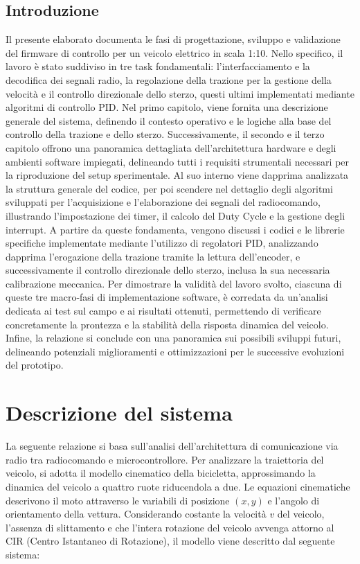 \documentclass[11pt]{report}
\begin{document}
\pagestyle{plain}

\section*{Introduzione}
Il presente elaborato documenta le fasi di progettazione, sviluppo e validazione del firmware di controllo per un veicolo elettrico in scala 1:10. Nello specifico, il lavoro è stato suddiviso in tre task fondamentali: l'interfacciamento e la decodifica dei segnali radio, la regolazione della trazione per la gestione della velocità e il controllo direzionale dello sterzo, questi ultimi implementati mediante algoritmi di controllo PID.
Nel primo capitolo, viene fornita una descrizione generale del sistema, definendo il contesto operativo e le logiche alla base del controllo della trazione e dello sterzo. Successivamente, il secondo e il terzo capitolo offrono una panoramica dettagliata dell'architettura hardware e degli ambienti software impiegati, delineando tutti i requisiti strumentali necessari per la riproduzione del setup sperimentale. 
Al suo interno viene dapprima analizzata la struttura generale del codice, per poi scendere nel dettaglio degli algoritmi sviluppati per l'acquisizione e l'elaborazione dei segnali del radiocomando, 
illustrando l'impostazione dei timer, il calcolo del Duty Cycle e la gestione degli interrupt. A partire da queste fondamenta, vengono discussi i codici e le librerie specifiche implementate mediante l'utilizzo di regolatori PID, analizzando dapprima l'erogazione della trazione tramite la lettura dell'encoder, e successivamente il controllo direzionale dello sterzo, inclusa la sua necessaria calibrazione meccanica. 
Per dimostrare la validità del lavoro svolto, ciascuna di queste tre macro-fasi di implementazione software, è corredata da un'analisi dedicata ai test sul campo e ai risultati ottenuti, 
permettendo di verificare concretamente la prontezza e la stabilità della risposta dinamica del veicolo. Infine, la relazione si conclude con una panoramica sui possibili sviluppi futuri, delineando potenziali miglioramenti e ottimizzazioni per le successive evoluzioni del prototipo.

\newpage
\chapter{Descrizione del sistema}
La seguente relazione si basa sull'analisi dell'architettura di comunicazione via radio tra radiocomando e microcontrollore. 
Per analizzare la traiettoria del veicolo, si adotta il modello cinematico della bicicletta, approssimando la dinamica del veicolo a quattro ruote riducendola a due. Le equazioni cinematiche descrivono il moto attraverso le variabili di posizione $(x,y)$ e l'angolo di orientamento della vettura. Considerando costante la velocità $v$ del veicolo, l'assenza di slittamento e che l'intera rotazione del veicolo avvenga attorno al CIR (Centro Istantaneo di Rotazione), il modello viene descritto dal seguente sistema:
\end{document}
